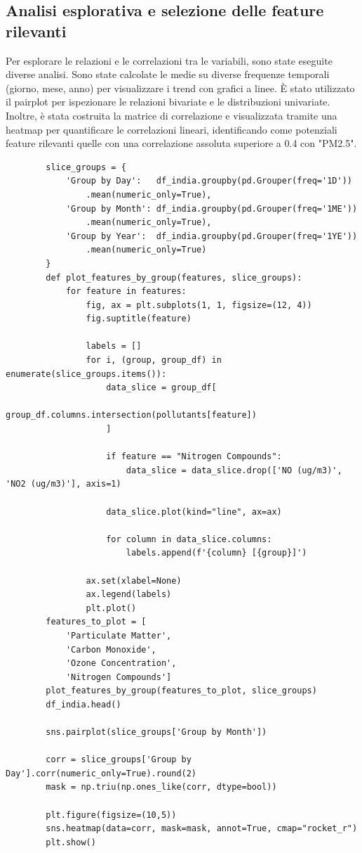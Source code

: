 \documentclass[a4paper,12pt]{report}
\begin{document}
	\subsection{Analisi esplorativa e selezione delle feature rilevanti}
	Per esplorare le relazioni e le correlazioni tra le variabili, sono state eseguite diverse analisi. Sono state calcolate le medie su diverse frequenze temporali (giorno, mese, anno) per visualizzare i trend con grafici a linee. È stato utilizzato il pairplot per ispezionare le relazioni bivariate e le distribuzioni univariate. Inoltre, è stata costruita la matrice di correlazione e visualizzata tramite una heatmap per quantificare le correlazioni lineari, identificando come potenziali feature rilevanti quelle con una correlazione assoluta superiore a 0.4 con "PM2.5".
	
	\begin{verbatim}
		slice_groups = {
			'Group by Day':   df_india.groupby(pd.Grouper(freq='1D'))
				.mean(numeric_only=True),
			'Group by Month': df_india.groupby(pd.Grouper(freq='1ME'))
				.mean(numeric_only=True),
			'Group by Year':  df_india.groupby(pd.Grouper(freq='1YE'))
				.mean(numeric_only=True)
		}
		def plot_features_by_group(features, slice_groups):
			for feature in features:
				fig, ax = plt.subplots(1, 1, figsize=(12, 4))
				fig.suptitle(feature)
				
				labels = []
				for i, (group, group_df) in enumerate(slice_groups.items()):
					data_slice = group_df[
						group_df.columns.intersection(pollutants[feature])
					]
					
					if feature == "Nitrogen Compounds":
						data_slice = data_slice.drop(['NO (ug/m3)', 'NO2 (ug/m3)'], axis=1)
					
					data_slice.plot(kind="line", ax=ax)
					
					for column in data_slice.columns:
						labels.append(f'{column} [{group}]')
				
				ax.set(xlabel=None)
				ax.legend(labels)
				plt.plot()
		features_to_plot = [
			'Particulate Matter', 
			'Carbon Monoxide', 
			'Ozone Concentration', 
			'Nitrogen Compounds']
		plot_features_by_group(features_to_plot, slice_groups)
		df_india.head()
		
		sns.pairplot(slice_groups['Group by Month'])
		
		corr = slice_groups['Group by Day'].corr(numeric_only=True).round(2)
		mask = np.triu(np.ones_like(corr, dtype=bool))
		
		plt.figure(figsize=(10,5))
		sns.heatmap(data=corr, mask=mask, annot=True, cmap="rocket_r")
		plt.show()
	\end{verbatim}
	
\end{document}
